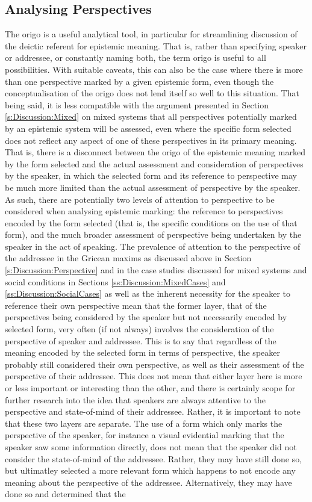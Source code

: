 \subsection{Analysing Perspectives}
The origo is a useful analytical tool, in particular for streamlining discussion of the deictic referent for epistemic meaning. That is, rather than specifying speaker or addressee, or constantly naming both, the term origo is useful to all possibilities. With suitable caveats, this can also be the case where there is more than one perspective marked by a given epistemic form, even though the conceptualisation of the origo does not lend itself so well to this situation. That being said, it is less compatible with the argument presented in Section \ref{s:Discussion:Mixed} on mixed systems that all perspectives potentially marked by an epistemic system will be assessed, even where the specific form selected does not reflect any aspect of one of these perspectives in its primary meaning. That is, there is a disconnect between the origo of the epistemic meaning marked by the form selected and the actual assessment and consideration of perspectives by the speaker, in which the selected form and its reference to perspective may be much more limited than the actual assessment of perspective by the speaker. As such, there are potentially two levels of attention to perspective to be considered when analysing epistemic marking: the reference to perspectives encoded by the form selected (that is, the specific conditions on the use of that form), and the much broader assessment of perspective being undertaken by the speaker in the act of speaking. The prevalence of attention to the perspective of the addressee in the Gricean maxims as discussed above in Section \ref{s:Discussion:Perspective} and in the case studies discussed for mixed systems and social conditions in Sections \ref{ss:Discussion:MixedCases} and \ref{ss:Discussion:SocialCases} as well as the inherent necessity for the speaker to reference their own perspective mean that the former layer, that of the perspectives being considered by the speaker but not necessarily encoded by selected form, very often (if not always) involves the consideration of the perspective of speaker and addressee. This is to say that regardless of the meaning encoded by the selected form in terms of perspective, the speaker probably still considered their own perspective, as well as their assessment of the perspective of their addressee. This does not mean that either layer here is more or less important or interesting than the other, and there is certainly scope for further research into the idea that speakers are always attentive to the perspective and state-of-mind of their addressee. Rather, it is important to note that these two layers are separate. The use of a form which only marks the perspective of the speaker, for instance a visual evidential marking that the speaker saw some information directly, does not mean that the speaker did not consider the state-of-mind of the addressee. Rather, they may have still done so, but ultimatley selected a more relevant form which happens to not encode any meaning about the perspective of the addressee. Alternatively, they may have done so and determined that the 